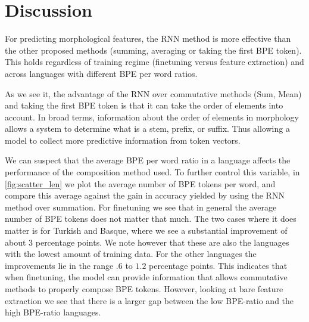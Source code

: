 \documentclass[11pt]{article}
\newcommand\adam[1]{(\textbf{Adam:} #1)}
\begin{document}
	\section{Discussion}

        For predicting morphological features, the RNN method is more
     effective than the other proposed methods (summing, averaging or
     taking the first BPE token). This holds regardless of training
     regime (finetuning versus feature extraction) and across
     languages with different BPE per word ratios.
    
                 As we see it, the advantage of the RNN over
     commutative methods (Sum, Mean) and taking the first BPE token is
     that it can take the order of elements into account. In broad
     terms, information about the order of elements in morphology
     allows a system to determine what is a stem, prefix, or suffix.
      Thus allowing a model to collect more predictive information
     from token vectors.

             We can suspect that the average BPE per word ratio in a
     language affects the performance of the composition method
     used. To further control this variable, in \cref{fig:scatter_len}
     we plot the average number of BPE tokens per word, and compare
     this average against the gain in accuracy yielded by using the
     RNN method over summation.  For finetuning we see that in
     general the average number of BPE tokens does not matter that
     much. The two cases where it does matter is for Turkish and
     Basque, where we see a substantial improvement of about $3$
     percentage points. We note however that these are also the
     languages with the lowest amount of training data.
        For the other languages the improvements lie in the range $.6$
     to $1.2$ percentage points. This indicates that when finetuning,
     the model can provide information that allows commutative methods
     to properly compose BPE tokens. However, looking at bare feature
     extraction we see that there is a larger gap between the low
     BPE-ratio and the high BPE-ratio languages.
\end{document}
